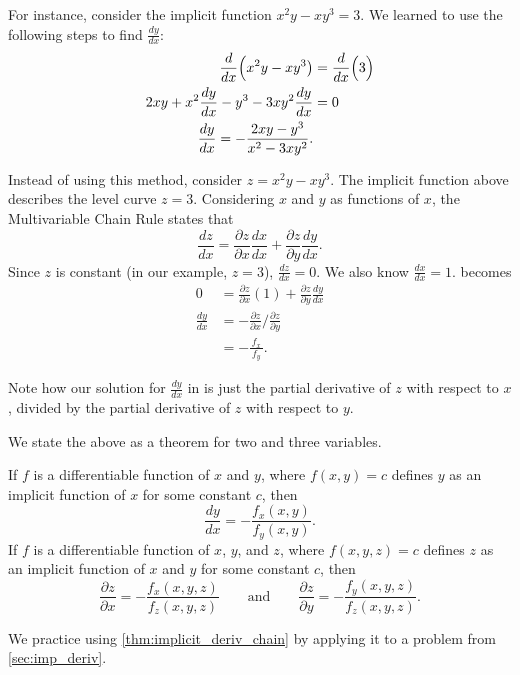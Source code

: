 For instance, consider the implicit function $x^2y-xy^3=3.$ We learned to use the following steps to find $\frac{dy}{dx}$:
\begin{align}
\frac{d}{dx}\Big(x^2y-xy^3\big) &= \frac{d}{dx}\Big(3\Big) \notag\\
2xy + x^2\frac{dy}{dx}-y^3-3xy^2\frac{dy}{dx} &= 0\notag \\
\frac{dy}{dx} = -\frac{2xy-y^3}{x^2-3xy^2}.\label{eq:mchain2}
\end{align}

Instead of using this method, consider $z=x^2y-xy^3$. The implicit function above describes the level curve $z=3$. Considering $x$ and $y$ as functions of $x$, the Multivariable Chain Rule states that
\begin{equation}\frac{dz}{dx} = \frac{\partial z}{\partial x}\frac{dx}{dx}+\frac{\partial z}{\partial y}\frac{dy}{dx}.\label{eq:mchain1}\end{equation}
Since $z$ is constant (in our example, $z=3$), $\frac{dz}{dx} = 0$. We also know $\frac{dx}{dx} = 1$.  becomes
\begin{align*}
0 &= \frac{\partial z}{\partial x}(1) + \frac{\partial z}{\partial y}\frac{dy}{dx} %
\\[5pt]
\frac{dy}{dx} &= -\frac{\partial z}{\partial x}\Big/\frac{\partial z}{\partial y}\\[5pt]
			&= -\frac{\,f_x\,}{f_y}.
\end{align*}

Note how our solution for $\frac{dy}{dx}$ in  is just the partial derivative of $z$ with respect to $x$, divided by the partial derivative of $z$ with respect to $y$.

We state the above as a theorem for two and three variables.

{If $f$ is a differentiable function of $x$ and $y$, where $f(x,y)=c$ defines $y$ as  an implicit function of $x$ for some constant $c$, then
\[\frac{dy}{dx} = - \frac{f_x(x,y)}{f_y(x,y)}.\]
If $f$ is a differentiable function of $x$, $y$, and $z$, where $f(x,y,z)=c$ defines $z$ as an implicit function of $x$ and $y$ for some constant $c$, then
\[
\frac{\partial z}{\partial x}=-\frac{f_x(x,y,z)}{f_z(x,y,z)}
\qquad\text{and}\qquad
\frac{\partial z}{\partial y}=-\frac{f_y(x,y,z)}{f_z(x,y,z)}.
\]
}

We practice using \autoref{thm:implicit_deriv_chain} by applying it to a problem from \autoref{sec:imp_deriv}.

